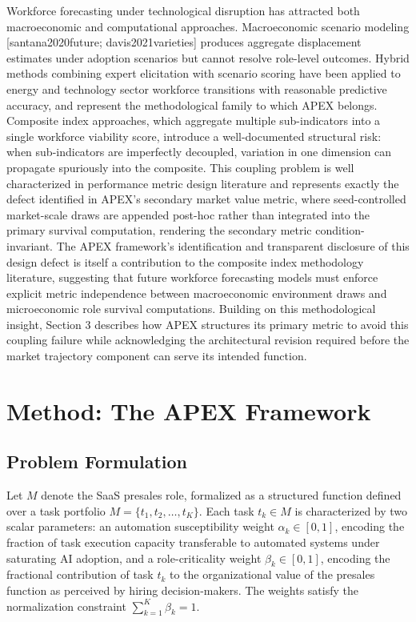 \documentclass[10pt, conference]{IEEEtran}
\begin{document}
Workforce forecasting under technological disruption has attracted both macroeconomic and computational approaches. Macroeconomic scenario modeling [santana2020future; davis2021varieties] produces aggregate displacement estimates under adoption scenarios but cannot resolve role-level outcomes. Hybrid methods combining expert elicitation with scenario scoring \cite{wiser2021expert} have been applied to energy and technology sector workforce transitions with reasonable predictive accuracy, and represent the methodological family to which APEX belongs. Composite index approaches, which aggregate multiple sub-indicators into a single workforce viability score, introduce a well-documented structural risk: when sub-indicators are imperfectly decoupled, variation in one dimension can propagate spuriously into the composite. This coupling problem is well characterized in performance metric design literature \cite{virtanen2020scipy} and represents exactly the defect identified in APEX's secondary market value metric, where seed-controlled market-scale draws are appended post-hoc rather than integrated into the primary survival computation, rendering the secondary metric condition-invariant. The APEX framework's identification and transparent disclosure of this design defect is itself a contribution to the composite index methodology literature, suggesting that future workforce forecasting models must enforce explicit metric independence between macroeconomic environment draws and microeconomic role survival computations. Building on this methodological insight, Section 3 describes how APEX structures its primary metric to avoid this coupling failure while acknowledging the architectural revision required before the market trajectory component can serve its intended function.

\section{Method: The APEX Framework}

\label{sec:method_the_apex_framework}

\subsection{Problem Formulation}

\label{sec:problem_formulation}

Let $M$ denote the SaaS presales role, formalized as a structured function defined over a task portfolio $M = \{t_1, t_2, \ldots, t_K\}$. Each task $t_k \in M$ is characterized by two scalar parameters: an automation susceptibility weight $\alpha_k \in [0,1]$, encoding the fraction of task execution capacity transferable to automated systems under saturating AI adoption, and a role-criticality weight $\beta_k \in [0,1]$, encoding the fractional contribution of task $t_k$ to the organizational value of the presales function as perceived by hiring decision-makers. The weights satisfy the normalization constraint $\sum_{k=1}^{K} \beta_k = 1$.
\end{document}

